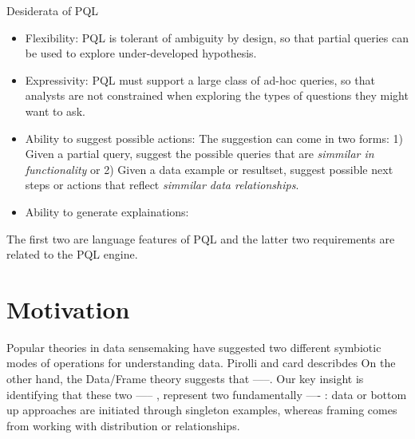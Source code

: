 \documentclass{sig-alternate-05-2015}
\begin{document}
Desiderata of PQL 
\begin{itemize}
	\item Flexibility: PQL is tolerant of ambiguity by design, so that partial queries can be used to explore under-developed hypothesis.
	\item Expressivity: PQL must support a large class of ad-hoc queries, so that analysts are not constrained when exploring the types of questions they might want to ask.
	\item Ability to suggest possible actions: The suggestion can come in two forms: 1) Given a partial query, suggest the possible queries that are \textit{simmilar in functionality} or 2) Given a data example or resultset, suggest possible next steps or actions that reflect \textit{simmilar data relationships}.
	\item Ability to generate explainations:
\end{itemize}
The first two are language features of PQL and the latter two requirements are related to the PQL engine. 
\section{Motivation}
\par Popular theories in data sensemaking have suggested two different symbiotic modes of operations for understanding data. Pirolli and card describdes
On the other hand, the Data/Frame theory suggests that 
-----. 
Our key insight is identifying that these two ----- , represent two fundamentally ---- : data or bottom up approaches are initiated through singleton examples, whereas framing comes from working with distribution or relationships.
\end{document}
